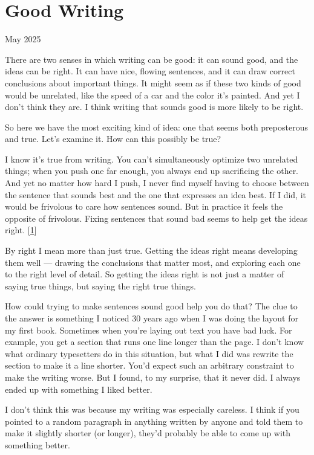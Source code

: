 \chapter{Good Writing}





May 2025

There are two senses in which writing can be good: it can
sound good, and the ideas can be right. It can have nice,
flowing sentences, and it can draw correct conclusions
about important things. It might seem as if these two
kinds of good would be unrelated, like the speed of a car
and the color it's painted. And yet I don't think they
are. I think writing that sounds good is more likely to
be right.

So here we have the most exciting kind of idea: one that
seems both preposterous and true. Let's examine it. How
can this possibly be true?

I know it's true from writing. You can't simultaneously
optimize two unrelated things; when you push one far
enough, you always end up sacrificing the other. And yet
no matter how hard I push, I never find myself having to
choose between the sentence that sounds best and the one
that expresses an idea best. If I did, it would be
frivolous to care how sentences sound. But in practice it
feels the opposite of frivolous. Fixing sentences that
sound bad seems to help get the ideas right.
[\href{\#f1n}{1}]

By right I mean more than just true. Getting the ideas
right means developing them well --- drawing the
conclusions that matter most, and exploring each one to
the right level of detail. So getting the ideas right is
not just a matter of saying true things, but saying the
right true things.

How could trying to make sentences sound good help you do
that? The clue to the answer is something I noticed 30
years ago when I was doing the layout for my first book.
Sometimes when you're laying out text you have bad luck.
For example, you get a section that runs one line longer
than the page. I don't know what ordinary typesetters do
in this situation, but what I did was rewrite the section
to make it a line shorter. You'd expect such an arbitrary
constraint to make the writing worse. But I found, to my
surprise, that it never did. I always ended up with
something I liked better.

I don't think this was because my writing was especially
careless. I think if you pointed to a random paragraph in
anything written by anyone and told them to make it
slightly shorter (or longer), they'd probably be able to
come up with something better.

